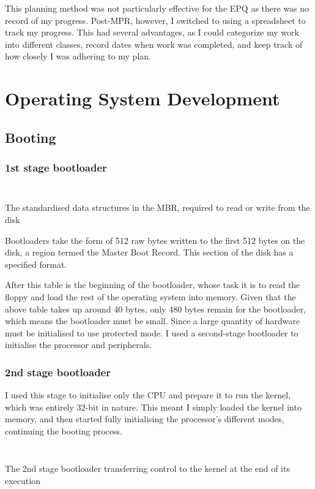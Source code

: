 \documentclass[a4paper,12pt]{article}
\begin{document}
This planning method was not particularly effective for the EPQ as there was no record of my progress. Post-MPR, however, I switched to using a spreadsheet to track my progress. This had several advantages, as I could categorize my work into different classes, record dates when work was completed, and keep track of how closely I was adhering to my plan.

\section{Operating System Development}

\subsection{Booting}
\subsubsection{1st stage bootloader}
\begin{listing}[H]
\ifwindows
\inputminted[breaklines, linenos, numbersep=5pt, firstline=11,lastline=37]{nasm}{../os/kernel/boot/mbr.asm} %
\else
\inputminted[breaklines, linenos, numbersep=5pt, firstline=11,lastline=37]{nasm}{/home/vedantg/os/kernel/boot/mbr.asm} %
\fi
\caption{The standardised data structures in the MBR, required to read or write from the disk}
\label{listing:mbr}
\end{listing}

Bootloaders take the form of 512 raw bytes written to the first 512 bytes on the disk, a region termed the Master Boot Record. This section of the disk has a specified format. 

After this table is the beginning of the bootloader, whose task it is to read the floppy and load the rest of the operating system into memory. Given that the above table takes up around 40 bytes, only 480 bytes remain for the bootloader, which means the bootloader must be small. 
Since a large quantity of hardware must be initialised to use protected mode. I used a second-stage bootloader to initialise the processor and peripherals.
\subsubsection{2nd stage bootloader}
I used this stage to initialise only the CPU and prepare it to run the kernel, which was entirely 32-bit in nature. This meant I simply loaded the kernel into memory, and then started fully initialising the processor's different modes, continuing the booting process.
\begin{listing}[H]
\ifwindows
\inputminted[breaklines, linenos, numbersep=5pt, firstline=338, lastline=342]{nasm}{../os/kernel/boot/stage2.asm} %
\else
\inputminted[breaklines, linenos, numbersep=5pt, firstline=338, lastline=342]{nasm}{/home/vedantg/os/kernel/boot/stage2.asm} %
\fi
\caption{The 2nd stage bootloader transferring control to the kernel at the end of its execution}
\label{listing:stage2}
\end{listing}
\end{document}
